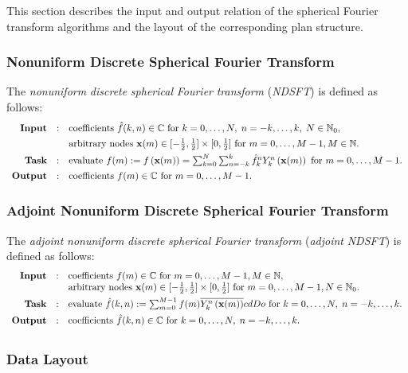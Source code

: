 This section describes the input and output relation of the spherical Fourier transform algorithms and the layout of the corresponding plan structure.\hypertarget{group__nfsft_ndsft}{}\subsubsection{Nonuniform Discrete Spherical Fourier Transform}\label{group__nfsft_ndsft}
The {\em nonuniform\/} {\em discrete\/} {\em spherical\/} {\em Fourier\/} {\em transform\/} ({\em NDSFT\/}) is defined as follows: \[ \begin{array}{rcl} \text{\textbf{Input}} & : & \text{coefficients } \hat{f}(k,n) \in \mathbb{C} \text{ for } k=0,\ldots,N,\;n=-k, \ldots,k,\; N \in \mathbb{N}_0,\\[1ex] & & \text{arbitrary nodes } \mathbf{x}(m) \in [-\frac{1}{2},\frac{1}{2}] \times [0,\frac{1}{2}] \text{ for } m=0,\ldots,M-1, M \in \mathbb{N}. \\[1ex] \text{\textbf{Task}} & : & \text{evaluate } f(m) := f\left( \mathbf{x}(m)\right) = \sum_{k=0}^N \sum_{n=-k}^k \hat{f}_k^n Y_k^n\left(\mathbf{x}(m)\right) \text{ for } m=0,\ldots,M-1. \\[1ex] \text{\textbf{Output}} & : & \text{coefficients } f(m) \in \mathbb{C} \text{ for } m=0,\ldots,M-1.\\ \end{array} \]\hypertarget{group__nfsft_andsft}{}\subsubsection{Adjoint Nonuniform Discrete Spherical Fourier Transform}\label{group__nfsft_andsft}
The {\em adjoint\/} {\em nonuniform\/} {\em discrete\/} {\em spherical\/} {\em Fourier\/} {\em transform\/} ({\em adjoint\/} {\em NDSFT\/}) is defined as follows: \[ \begin{array}{rcl} \text{\textbf{Input}} & : & \text{coefficients } f(m) \in \mathbb{C} \text{ for } m=0,\ldots,M-1, M \in \mathbb{N},\\ & & \text{arbitrary nodes } \mathbf{x}(m) \in [-\frac{1}{2},\frac{1}{2}] \times [0,\frac{1}{2}] \text{ for } m=0,\ldots,M-1, N \in \mathbb{N}_0.\\[1ex] \text{\textbf{Task}} & : & \text{evaluate } \hat{f}(k,n) := \sum_{m=0}^{M-1} f(m) \overline{Y_k^n\left(\mathbf{x}(m)\right)}cd Do \text{ for } k=0,\ldots,N,\;n=-k,\ldots,k.\\[1ex] \text{\textbf{Output}} & : & \text{coefficients } \hat{f}(k,n) \in \mathbb{C} \text{ for } k=0,\ldots,N,\;n=-k,\ldots,k.\\[1ex] \end{array} \]\hypertarget{group__nfsft_dl}{}\subsubsection{Data Layout}\label{group__nfsft_dl}
